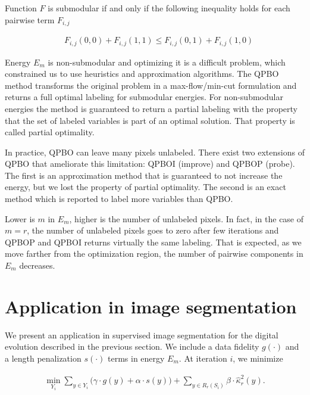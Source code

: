 \documentclass[runningheads]{llncs}
\begin{document}
Function $F$ is submodular if and only if the following inequality holds for each pairwise term $F_{i,j}$ \cite{kolmogorov04whatenergies}

\begin{align*}
	\quad F_{i,j}(0,0) + F_{i,j}(1,1) \leq F_{i,j}(0,1) + F_{i,j}(1,0)
\end{align*}

Energy $E_m$ is non-submodular and optimizing it is a difficult problem, which
constrained us to use heuristics and approximation algorithms. The QPBO method \cite{rother07qpbo} transforms the 
original problem in a max-flow/min-cut formulation and returns a full optimal labeling for submodular energies. For
non-submodular energies the method is guaranteed to return a partial labeling with the property that the set of labeled
variables is part of an optimal solution. That property is called partial optimality.

In practice, QPBO can leave many pixels unlabeled. There exist two extensions of QPBO that ameliorate this limitation: QPBOI
(improve) and QPBOP (probe). The first is an approximation method that is guaranteed to not increase the energy, but we
lost the property of partial optimality. The second is an exact method which is reported to label more variables than
QPBO. 

Lower is $m$ in $E_m$, higher is the number of unlabeled pixels. In fact, in the case of $m=r$, the number of unlabeled pixels goes to zero after few iterations and QPBOP and QPBOI returns virtually the same labeling. That is expected, as we move farther from the optimization region, the number of pairwise components in $E_m$ decreases.


\section{Application in image segmentation}

We present an application in supervised image segmentation for the digital evolution described in the previous section. We include a data fidelity $g(\cdot)$ and a length penalization $s(\cdot)$ terms in energy $E_m$. At iteration $i$, we minimize

\begin{align}			
	\min_{Y_i} \sum_{y \in Y_i}{\Big( \gamma \cdot g(y) + \alpha \cdot s(y) \Big)} + \sum_{y \in R_r(S_i)}{ \beta \cdot \hat{\kappa}_{r}^2(y)}.
	\label{eq:boundary-correction-energy}
\end{align}
	
\end{document}
